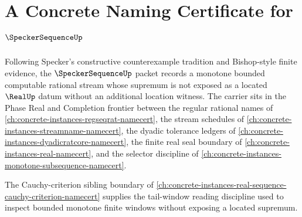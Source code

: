 \chapter{A Concrete Naming Certificate for $\SpeckerSequenceUp$}
\label{ch:concrete-instances-speckersequence-namecert}

Following Specker's constructive counterexample tradition and Bishop-style finite evidence, the $\SpeckerSequenceUp$ packet records a monotone bounded computable rational stream whose supremum is not exposed as a located $\RealUp$ datum without an additional location witness. The carrier sits in the Phase Real and Completion frontier between the regular rational names of \autoref{ch:concrete-instances-regseqrat-namecert}, the stream schedules of \autoref{ch:concrete-instances-streamname-namecert}, the dyadic tolerance ledgers of \autoref{ch:concrete-instances-dyadicratcore-namecert}, the finite real seal boundary of \autoref{ch:concrete-instances-real-namecert}, and the selector discipline of \autoref{ch:concrete-instances-monotone-subsequence-namecert}.

The Cauchy-criterion sibling boundary of \autoref{ch:concrete-instances-real-sequence-cauchy-criterion-namecert} supplies the tail-window reading discipline used to inspect bounded monotone finite windows without exposing a located supremum.

